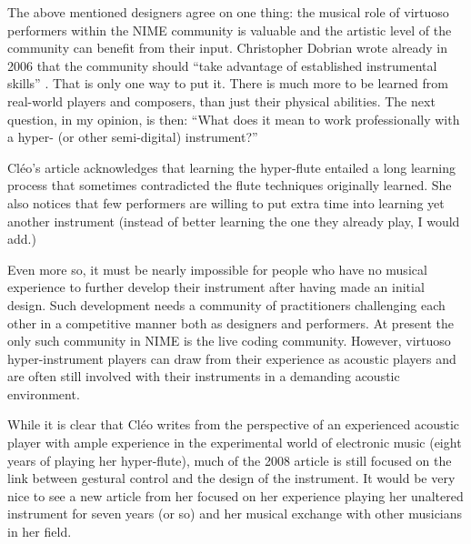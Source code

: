 The above mentioned designers agree on one thing: the musical role of virtuoso performers within the NIME community is valuable and the artistic level of the community can benefit from their input. Christopher Dobrian wrote already in 2006 that the community should ``take advantage of established instrumental skills'' \cite{Dobrian:2006}. That is only one way to put it. There is much more to be learned from real-world players and composers, than just their physical abilities. The next question, in my opinion, is then: ``What does it mean to work professionally with a hyper- (or other semi-digital) instrument?''

Cl\'{e}o's article acknowledges that learning the hyper-flute entailed a long learning process that sometimes contradicted the flute techniques originally learned. She also notices that few performers are willing to put extra time into learning yet another instrument (instead of better learning the one they already play, I would add.)

Even more so, it must be nearly impossible for people who have no musical experience to further develop their instrument after having made an initial design. Such development needs a community of practitioners challenging each other in a competitive manner both as designers and performers. At present the only such community in NIME is the live coding community. However, virtuoso hyper-instrument players can draw from their experience as acoustic players and are often still involved with their instruments in a demanding acoustic environment.

While it is clear that Cl\'{e}o writes from the perspective of an experienced acoustic player with ample experience in the experimental world of electronic music (eight years of playing her hyper-flute), much of the 2008 article is still focused on the link between gestural control and the design of the instrument. It would be very nice to see a new article from her focused on her experience playing her unaltered instrument for seven years (or so) and her musical exchange with other musicians in her field.

